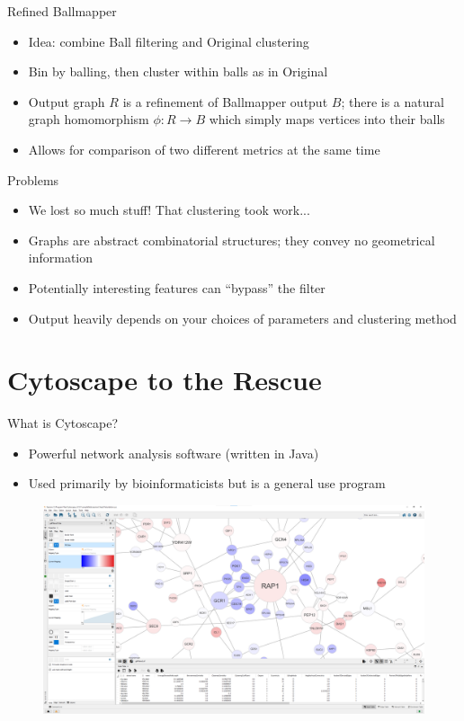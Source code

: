 \documentclass{beamer}
\begin{document}
\begin{frame}{Refined Ballmapper}
  \begin{itemize}
    \item Idea: combine Ball filtering and Original clustering
    \item Bin by balling, then cluster within balls as in Original
    \item Output graph $R$ is a refinement of Ballmapper output $B$; there 
    is a natural graph homomorphism $\phi: R\to B$ which simply maps vertices into their balls
    \item Allows for comparison of two different metrics at the same time
  \end{itemize}
  
\end{frame}

\begin{frame}{Problems}
  \begin{itemize}
    \item We lost so much stuff! That clustering took work...
    \item Graphs are abstract combinatorial structures; they convey no geometrical information
    \item Potentially interesting features can ``bypass'' the filter
    \item Output heavily depends on your choices of parameters and clustering method
  \end{itemize}
  
\end{frame}
\section{Cytoscape to the Rescue}
\begin{frame}{What is Cytoscape?}
  \begin{itemize}
    \item Powerful network analysis software (written in Java)
    \item Used primarily by bioinformaticists but is a general use program
  \end{itemize}
  \begin{figure}
    \begin{center}
      \includegraphics[width=1\textwidth]{cytoyeast.png}
    \end{center}
  \end{figure}
\end{frame}
\end{document}
